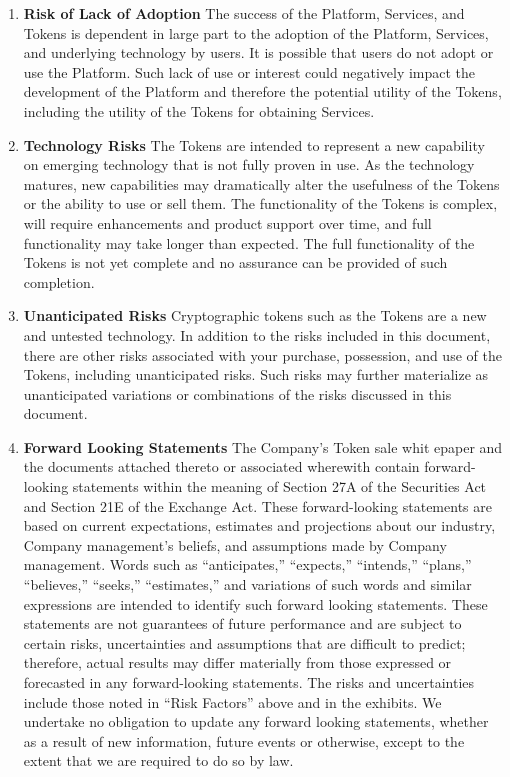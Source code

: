 \begin{enumerate}
    \item \textbf{Risk of Lack of Adoption}
    The success of the Platform, Services, and Tokens is dependent in large part to the adoption of the Platform, Services, and underlying technology by users. It is possible that users do not adopt or use the Platform. Such lack of use or interest could negatively impact the development of the Platform and therefore the potential utility of the Tokens, including the utility of the Tokens for obtaining Services.
    
    \item \textbf{Technology Risks}
    The Tokens are intended to represent a new capability on emerging technology that is not fully proven in use. As the technology matures, new capabilities may dramatically alter the usefulness of the Tokens or the ability to use or sell them. The functionality of the Tokens is complex, will require enhancements and product support over time, and full functionality may take longer than expected. The full functionality of the Tokens is not yet complete and no assurance can be provided of such completion.
    
    \item \textbf{Unanticipated Risks}
    Cryptographic tokens such as the Tokens are a new and untested technology. In addition to the risks included in this document, there are other risks associated with your purchase, possession, and use of the Tokens, including unanticipated risks. Such risks may further materialize as unanticipated variations or combinations of the risks discussed in this document.
    
    \item \textbf{Forward Looking Statements}
    The Company’s Token sale whit epaper and the documents attached thereto or associated wherewith contain forward-looking statements within the meaning of Section 27A of the Securities Act and Section 21E of the Exchange Act. These forward-looking statements are based on current expectations, estimates and projections about our industry, Company management’s beliefs, and assumptions made by Company management. Words such as “anticipates,” “expects,” “intends,” “plans,” “believes,” “seeks,” “estimates,” and variations of such words and similar expressions are intended to identify such forward looking statements. These statements are not guarantees of future performance and are subject to certain risks, uncertainties and assumptions that are difficult to predict; therefore, actual results may differ materially from those expressed or forecasted in any forward-looking statements. The risks and uncertainties include those noted in “Risk Factors” above and in the exhibits. We undertake no obligation to update any forward looking statements, whether as a result of new information, future events or otherwise, except to the extent that we are required to do so by law.
\end{enumerate}


